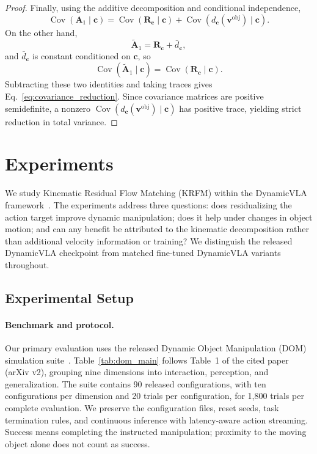 \documentclass[10pt,twocolumn,letterpaper]{article}
\begin{document}
\begin{proof}
Finally, using the additive decomposition and conditional independence,
\[
    \operatorname{Cov}
    (
        \mathbf A_1
        \mid
        \mathbf c
    )
    =
    \operatorname{Cov}
    (
        \mathbf R_{\mathbf c}
        \mid
        \mathbf c
    )
    +
    \operatorname{Cov}
    (
        d_{\mathbf c}(\mathbf v^{\mathrm{obj}})
        \mid
        \mathbf c
    ).
\]
On the other hand,
\[
    \widetilde{\mathbf A}_1
    =
    \mathbf R_{\mathbf c}
    +
    \bar d_{\mathbf c},
\]
and $\bar d_{\mathbf c}$ is constant conditioned on $\mathbf c$, so
\[
    \operatorname{Cov}
    (
        \widetilde{\mathbf A}_1
        \mid
        \mathbf c
    )
    =
    \operatorname{Cov}
    (
        \mathbf R_{\mathbf c}
        \mid
        \mathbf c
    ).
\]
Subtracting these two identities and taking traces gives
Eq.~\eqref{eq:covariance_reduction}. Since covariance matrices are positive
semidefinite, a nonzero
$\operatorname{Cov}(d_{\mathbf c}(\mathbf v^{\mathrm{obj}})\mid\mathbf c)$ has positive
trace, yielding strict reduction in total variance.
\end{proof}


\section{Experiments}
\label{sec:experiments}

We study Kinematic Residual Flow Matching (KRFM) within the DynamicVLA
framework~\citep{xie2026dynamicvla}. The experiments address three questions:
does residualizing the action target improve dynamic manipulation; does it
help under changes in object motion; and can any benefit be attributed to the
kinematic decomposition rather than additional velocity information or training?
We distinguish the released DynamicVLA checkpoint from matched fine-tuned
DynamicVLA variants throughout.

\subsection{Experimental Setup}
\label{sec:exp_setup}

\paragraph{Benchmark and protocol.}
Our primary evaluation uses the released Dynamic Object Manipulation (DOM)
simulation suite~\citep{xie2026dynamicvla}. Table~\ref{tab:dom_main} follows
Table~1 of the cited paper (arXiv v2), grouping nine dimensions into interaction,
perception, and generalization. The suite contains 90 released configurations,
with ten configurations per dimension and 20 trials per configuration, for
1,800 trials per complete evaluation. We preserve the configuration files,
reset seeds, task termination rules, and continuous inference with
latency-aware action streaming. Success means completing the instructed
manipulation; proximity to the moving object alone does not count as success.
\end{document}
